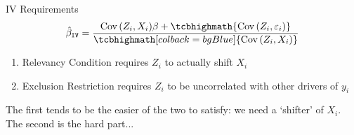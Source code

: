 \documentclass[aspectratio=169,t,11pt,table]{beamer}
\begin{document}
\begin{frame}{IV Requirements}
  \vspace{-\bigskipamount}
  \begin{align*}
    \hat{\beta}_{\texttt{IV}} = \frac{\cov{Z_i, X_i} \beta + \tcbhighmath{ \cov{Z_i, \varepsilon_i} }}{ \tcbhighmath[colback = bgBlue]{\cov{Z_i, X_i}} }
  \end{align*}


  \bigskip\bigskip
  \begin{enumerate}
    \item {\color{blue} Relevancy Condition} requires $Z_i$ to actually shift $X_i$
    
    \item {\color{raspberry} Exclusion Restriction} requires $Z_i$ to be uncorrelated with other drivers of $y_i$
  \end{enumerate}

  \pause
  \bigskip
  The first tends to be the easier of the two to satisfy: we need a `shifter' of $X_i$. The second is the hard part...
\end{frame}
\end{document}
